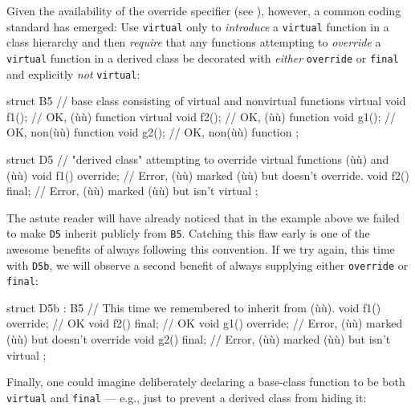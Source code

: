 {{Given the availability of the override specifier (see
), however, a common coding
standard has emerged: Use \lstinline!virtual! only to \emph{introduce} a
\lstinline!virtual! function in a class hierarchy and then \emph{require}
that any functions attempting to \emph{override} a \lstinline!virtual!
function in a derived class be decorated with \emph{either}
\lstinline!override! or \lstinline!final! and explicitly \emph{not}
\lstinline!virtual!:

\begin{emcppslisting}[emcppsbatch=e1]
struct B5  // base class consisting of virtual and nonvirtual functions
{
    virtual void f1();  // OK, (ù{}ù) function
    virtual void f2();  // OK, (ù{}ù) function
            void g1();  // OK, non(ù{}ù) function
            void g2();  // OK, non(ù{}ù) function
};

struct D5  // "derived class" attempting to override virtual functions (ù{}ù) and (ù{}ù)
{
    void f1() override;  // Error, (ù{}ù) marked (ù{}ù) but doesn't override.
    void f2() final;     // Error, (ù{}ù) marked (ù{}ù) but isn't virtual
};
\end{emcppslisting}
    

\noindent The astute reader will have already noticed that in the example above we
failed to make \lstinline!D5! inherit publicly from \lstinline!B5!. Catching
this flaw early is one of the awesome benefits of always following this
convention. If we try again, this time with \lstinline!D5b!, we will
observe a second benefit of always supplying either \lstinline!override! or
\lstinline!final!:

\begin{emcppslisting}[emcppsbatch=e1]
struct D5b : B5  // This time we remembered to inherit from (ù{}ù).
{
    void f1() override;  // OK
    void f2() final;     // OK
    void g1() override;  // Error, (ù{}ù) marked (ù{}ù) but doesn't override
    void g2() final;     // Error, (ù{}ù) marked (ù{}ù) but isn't virtual
};
\end{emcppslisting}
    

\noindent Finally, one could imagine deliberately declaring a base-class function
to be both \lstinline!virtual! and \lstinline!final! --- e.g., just to prevent
a derived class from hiding it:

}}
